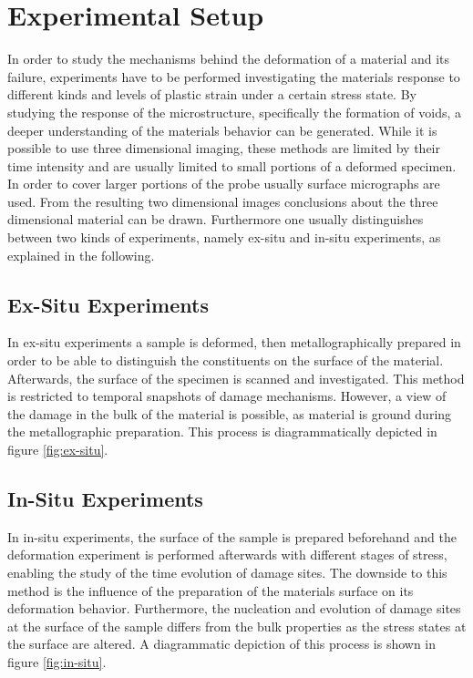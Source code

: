 \section{Experimental Setup}

In order to study the mechanisms behind the deformation of a material and its failure, experiments have to be performed investigating the materials response to different kinds and levels of plastic strain under a certain stress state. By studying the response of the microstructure, specifically the formation of voids, a deeper understanding of the materials behavior can be generated. While it is possible to use three dimensional imaging, these methods are limited by their time intensity and are usually limited to small portions of a deformed specimen. In order to cover larger portions of the probe usually surface micrographs are used. From the resulting two dimensional images conclusions about the three dimensional material can be drawn. Furthermore one usually distinguishes between two kinds of experiments, namely ex-situ and in-situ experiments, as explained in the following. \\
 
\subsection{Ex-Situ Experiments}

In ex-situ experiments a sample is deformed, then metallographically prepared in order to be able to distinguish the constituents on the surface of the material. Afterwards, the surface of the specimen is scanned and investigated. This method is restricted to temporal snapshots of damage mechanisms. However, a view of the damage in the bulk of the material is possible, as material is ground during the metallographic preparation. This process is diagrammatically depicted in figure \ref{fig:ex-situ}.\\

\subsection{In-Situ Experiments}

In in-situ experiments, the surface of the sample is prepared beforehand and the deformation experiment is performed afterwards with different stages of stress, enabling the study of the time evolution of damage sites. The downside to this method is the influence of the preparation of the materials surface on its deformation behavior. Furthermore, the nucleation and evolution of damage sites at the surface of the sample differs from the bulk properties as the stress states at the surface are altered.  A diagrammatic depiction of this process is shown in figure \ref{fig:in-situ}.\\



